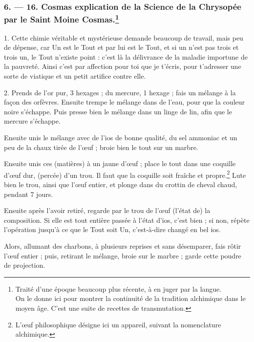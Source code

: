 \documentclass[a4paper, 11pt, oneside, polutonikogreek, french]{article}
\begin{document}
\bigskip
\centerline{\EightStarTaper}
\centerline{\EightStarTaper\EightStarTaper}
\bigskip

\subsubsection[6. --- 16. Cosmas explication de la Science de la Chrysopée par le Saint Moine Cosmas.]{6. --- 16. Cosmas explication de la Science de la Chrysopée par le Saint Moine Cosmas.\footnote{Traité d'une époque beaucoup plus récente, à en juger par la langue.\\\hspace*{5mm}On le donne ici pour montrer la continuité de la tradition alchimique dans le moyen âge. C'est une suite de recettes de transmutation.}}

1. Cette chimie véritable et mystérieuse demande beaucoup de travail, mais peu de dépense, car Un est le Tout et par lui est le Tout, et si un n'est pas trois et trois un, le Tout n'existe point : c'est là la délivrance de la maladie importune de la pauvreté. Ainsi c'est par affection pour toi que je t'écris, pour t'adresser une sorte de viatique et un petit artifice contre elle.

2. Prends de l'or pur, 3 hexages ; du mercure, 1 hexage ; fais un mélange à la façon des orfèvres. Ensuite trempe le mélange dans de l'eau, pour que la couleur noire s'échappe. Puis presse bien le mélange dans un linge de lin, afin que le mercure s'échappe.

Ensuite unis le mélange avec de l'ios de bonne qualité, du sel ammoniac et un peu de la chaux tirée de l'œuf ; broie bien le tout sur un marbre.

Ensuite unis ces (matières) à un jaune d'œuf ; place le tout dans une coquille d'œuf dur, (percée) d'un trou. Il faut que la coquille soit fraîche et propre.\footnote{L'œuf philosophique désigne ici un appareil, suivant la nomenclature alchimique.} Lute bien le trou, ainsi que l'œuf entier, et plonge dans du crottin de cheval chaud, pendant 7 jours.

Ensuite après l'avoir retiré, regarde par le trou de l'œuf (l'état de) la composition. Si elle est tout entière passée à l'état d'ios, c'est bien ; si non, répète l'opération jusqu'à ce que le Tout soit Un, c'est-à-dire changé en bel ios.

Alors, allumant des charbons, à plusieurs reprises et sans désemparer, fais rôtir l'œuf entier ; puis, retirant le mélange, broie sur le marbre ; garde cette poudre de projection.
\end{document}
